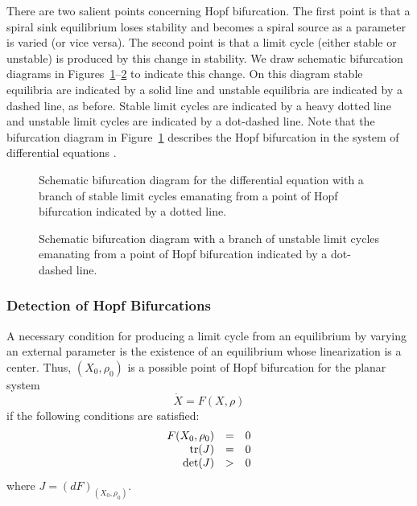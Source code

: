 There are two salient points concerning Hopf bifurcation.  The first point is 
that a spiral sink equilibrium loses stability and becomes a spiral source 
as a parameter is varied (or vice versa).  The second point is that a limit
cycle (either stable or unstable) is produced by this change in stability. 
We draw schematic bifurcation diagrams in
Figures~\ref{F:Hopfbifdiag}--\ref{F:Hopfbifdiag2} to indicate this change.  
On this diagram stable equilibria are indicated by a 
solid line and unstable equilibria are indicated by a dashed line, as before.
Stable limit cycles are indicated by a heavy dotted line and unstable limit 
cycles are indicated by a dot-dashed line.  Note that the bifurcation diagram
in Figure~\ref{F:Hopfbifdiag} describes the Hopf bifurcation in the system of
differential equations . 

\begin{figure}[htb]
           \centerline{%
           }
  \caption{Schematic bifurcation diagram for the differential equation 
    \protect{} with a branch of stable limit cycles emanating 
	from a point of Hopf bifurcation indicated by a dotted line.}
           \label{F:Hopfbifdiag}
\end{figure}

\begin{figure}[htb]
           \centerline{%
           }
  \caption{Schematic bifurcation diagram with a branch of unstable limit 
	cycles emanating from a point of Hopf bifurcation indicated by a 
	dot-dashed line.}
           \label{F:Hopfbifdiag2}
\end{figure}

\subsubsection*{Detection of Hopf Bifurcations}

A necessary condition for producing a limit cycle from an equilibrium by
varying an external parameter is the existence of an equilibrium whose
linearization is a center.  Thus, $(X_0,\rho_0)$ is a possible point of 
Hopf bifurcation for the planar system
\[
\dot{X} = F(X,\rho)
\]
if the following conditions are satisfied:
\begin{equation} \label{E:NCHB}
\begin{array}{rcl}
F(X_0,\rho_0) & = & 0\\
{\rm tr}(J) & = & 0\\
\det(J) & > & 0
\end{array}
\end{equation}
where $J= (dF)_{(X_0,\rho_0)}$.

